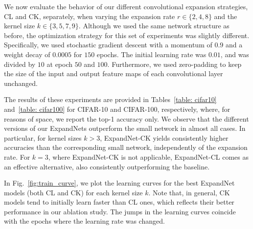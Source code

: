 \documentclass[10pt,twocolumn,letterpaper]{article}
\begin{document}
We now evaluate the behavior of our different convolutional expansion strategies, CL and CK, separately, when varying the expansion rate $r\in \{2, 4, 8\}$ and the kernel size $k \in \{3,5,7,9\}$. Although we used the same network structure as before, the optimization strategy for this set of experiments was slightly different. Specifically, we used stochastic gradient descent with a momentum of $0.9$ and a weight decay of $0.0005$ for $150$ epochs. The initial learning rate was $0.01$, and was divided by $10$ at epoch $50$ and $100$. Furthermore, we used zero-padding to keep the size of the input and output feature maps of each convolutional layer unchanged.

The results of these experiments are provided in Tables~\ref{table: cifar10} and~\ref{table: cifar100} for CIFAR-10 and CIFAR-100, respectively, where, for reasons of space, we report the top-1 accuracy only. We observe that the different versions of our ExpandNets outperform the small network in almost all cases. In particular, for kernel sizes $k>3$, ExpandNet-CK yields consistently higher accuracies than the corresponding small network, independently of the expansion rate. For $k=3$, where ExpandNet-CK is not applicable, ExpandNet-CL comes as an effective alternative, also consistently outperforming the baseline.

In Fig.~\ref{fig:train_curve}, we plot the learning curves for the best ExpandNet models (both CL and CK) for each kernel size $k$. Note that, in general, CK models tend to initially learn faster than CL ones, which reflects their better performance in our ablation study. The jumps in the learning curves coincide with the epochs where the learning rate was changed.
\end{document}
